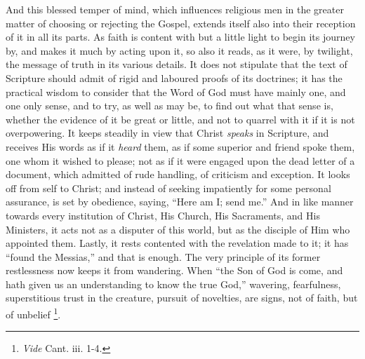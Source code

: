 And this blessed temper of mind, which influences religious men in
the greater matter of choosing or rejecting the Gospel, extends itself
also into their reception of it in all its parts. As faith is content
with but a little light to begin its journey by, and makes it much by
acting upon it, so also it reads, as it were, by twilight, the message
of truth in its various details. It does not stipulate that the text
of Scripture should admit of rigid and laboured proofs of its
doctrines; it has the practical wisdom to consider that the Word of
God must have mainly one, and one only sense, and to try, as well as
may be, to find out what that sense is, whether the evidence of it be
great or little, and not to quarrel with it if it is not overpowering.
It keeps steadily in view that Christ \emph{speaks} in Scripture, and
receives His words as if it \emph{heard} them, as if some superior and
friend spoke them, one whom it wished to please; not as if it were
engaged upon the dead letter of a document, which admitted of rude
handling, of criticism and exception. It looks off from self to
Christ; and instead of seeking impatiently for some personal
assurance, is set by obedience, saying, ``Here am I; send
me.'' And in like manner towards every institution of Christ, His
Church, His Sacraments, and His Ministers, it acts not as a disputer
of this world, but as the disciple of Him who appointed them. Lastly,
it rests contented with the revelation made to it; it has ``found
the Messias,'' and that is enough. The very principle of its
former restlessness now keeps it from wandering. When ``the Son of
God is come, and hath given us an understanding to know the true
God,'' wavering, fearfulness, superstitious trust in the creature,
pursuit of novelties, are signs, not of faith, but of unbelief \footnote{\emph{Vide} Cant. iii. 1-4.}.

